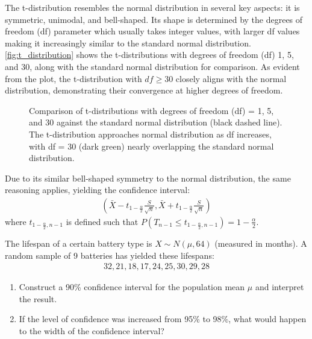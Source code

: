 \begin{enumerate}
    The t-distribution resembles the normal distribution in several key aspects: it is symmetric, unimodal, and bell-shaped.
    Its shape is determined by the degrees of freedom (df) parameter which usually takes integer values, with larger df values making it increasingly similar to the standard normal distribution.
    \autoref{fig:t_distribution} shows the t-distributions with degrees of freedom (df) 1, 5, and 30, along with the standard normal distribution for comparison.
    As evident from the plot, the t-distribution with \( df \geq 30 \) closely aligns with the normal distribution, demonstrating their convergence at higher degrees of freedom.
    \begin{figure}[t]
    \begin{center}
    \end{center}
    \caption{Comparison of t-distributions with degrees of freedom (df) = 1, 5, and 30 against the standard normal distribution (black dashed line). The t-distribution approaches normal distribution as df increases, with df = 30 (dark green) nearly overlapping the standard normal distribution.}
    \label{fig:t_distribution}
    \end{figure}

    Due to its similar bell-shaped symmetry to the normal distribution, the same reasoning applies, yielding the confidence interval:
    \begin{gather*}
        (\bar{X} - t_{1 - \frac{\alpha}{2}}\frac{S}{\sqrt{n}}, \bar{X} + t_{1 - \frac{\alpha}{2}}\frac{S}{\sqrt{n}})
    \end{gather*}
    where \( t_{1 - \frac{\alpha}{2}, n - 1} \) is defined such that \( P(T_{n - 1} \leq t_{1 - \frac{\alpha}{2}, n - 1}) = 1 - \frac{\alpha}{2} \).
\end{enumerate}
\begin{exmp}
    The lifespan of a certain battery type is \( X \sim N(\mu, 64) \) (measured in months).
    A random sample of 9 batteries has yielded these lifespans:
    \begin{gather*}
        32, 21, 18, 17, 24, 25, 30, 29, 28
    \end{gather*}
    \begin{enumerate}
        \item Construct a 90\% confidence interval for the population mean \( \mu \) and interpret the result.
        \item If the level of confidence was increased from 95\% to 98\%, what would happen to the width of the confidence interval?
    \end{enumerate}
\end{exmp}
